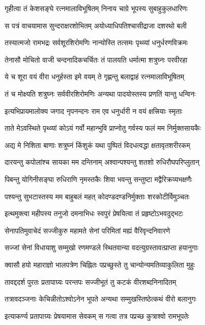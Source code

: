 \twolineshloka
{गृहीत्वा तं केशसङ्घे रत्नमालाविभूषितम्}
{निनाय चाग्रे भूपस्य सुबाहुकुलधारिणः}%

\twolineshloka
{स पत्रं वाचयामास सुन्दराक्षरशोभितम्}
{अयोध्याधिपतिश्चासीद्राजा दशरथो बली}%

\twolineshloka
{तस्यात्मजो रामभद्रः सर्वशूरशिरोमणिः}
{नान्योस्ति तत्समः पृथ्व्यां धनुर्धरणविक्रमः}%

\twolineshloka
{तेनासौ मोचितो वाजी चन्दनादिकचर्चितः}
{तं पालयति धर्मात्मा शत्रुघ्नः परवीरहा}%

\twolineshloka
{ये च शूरा वयं वीरा धनुर्हस्ता इमे वयम्}
{ते गृह्णन्तु बलाद्वाहं रत्नमालाविभूषितम्}%

\twolineshloka
{तं च मोक्ष्यति शत्रुघ्नः सर्ववीरशिरोमणिः}
{अन्यथा पादयोस्तस्य प्रणतिं यान्तु धन्विनः}%

\twolineshloka
{इत्यभिप्रायमालोक्य जगाद नृपनन्दनः}
{राम एव धनुर्धारी न वयं क्षत्त्रियाः स्मृताः}%

\twolineshloka
{ताते मेऽवस्थिते पृथ्व्यां कोऽयं गर्वो महान्भुवि}
{प्राप्नोतु गर्वस्य फलं मम निर्मुक्तसायकैः}%

\twolineshloka
{अद्य मे निशिता बाणाः शत्रुघ्नं किंशुकं यथा}
{पुष्पितं विदधत्वद्धा क्षतावृतशरीरकम्}%

\twolineshloka
{दारयन्तु कपोलांश्च सायका मम दन्तिनाम्}
{अश्वान्पश्यन्तु शतशो रुधिरौघपरिप्लुतान्}%

\twolineshloka
{पिबन्तु योगिनीसङ्घा रुधिराणि नृमस्तकैः}
{शिवा भवन्तु सन्तुष्टा मद्वैरिक्रव्यभक्षणैः}%

\twolineshloka
{पश्यन्तु सुभटास्तस्य मम बाहुबलं महत्}
{कोदण्डदण्डनिर्मुक्ताः शरकोटीर्विमुञ्चतः}%

\twolineshloka
{इत्थमुक्त्वा महीपस्य तनुजो दमनाभिधः}
{स्वपुरं प्रेषयित्वा तं प्रहृष्टोऽभवदुद्भटः}%

\twolineshloka
{सेनापतिमुवाचेदं सज्जीकुरु महामते}
{सेनां परिमितां मह्यं वैरिवृन्दनिवारणे}%

\twolineshloka
{सज्जां सेनां विधायाशु सम्मुखो रणमण्डले}
{स्थितवान्या वदत्युग्रस्तावत्प्राप्ता हयानुगाः}%

\twolineshloka
{क्वासौ हयो महाराज्ञो भालपत्रेण चिह्नितः}
{पप्रच्छुस्ते तु चान्योन्यमतिव्याकुलिता मुहुः}%

\twolineshloka
{तावद्ददर्श पुरतः प्रतापाग्र्यः परन्तपः}
{सज्जीभूतं तु कटकं वीरशब्दनिनादितम्}%

\twolineshloka
{तत्रावदञ्जनाः केचिन्नीतोऽश्वोऽनेन भूपते}
{अन्यथा सम्मुखस्तिष्ठेत्कथं वीरो बलानुगः}%

\twolineshloka
{इत्याकर्ण्य प्रतापाग्र्यः प्रेषयामास सेवकम्}
{स गत्वा तत्र पप्रच्छ कुत्राश्वो रामभूपतेः}%

